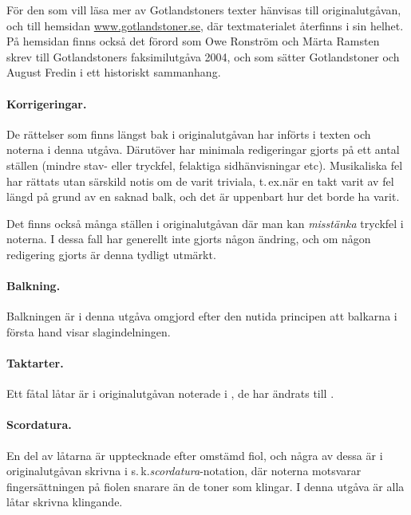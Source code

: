 {För den som vill läsa mer av Gotlandstoners texter hänvisas till originalutgåvan,
och till hemsidan \href{http://www.gotlandstoner.se/}{www.gotlandstoner.se}, där textmaterialet återfinns i sin helhet.
På hemsidan finns också det förord som Owe Ronström och
Märta Ramsten skrev till Gotlandstoners faksimilutgåva 2004, och som
sätter Gotlandstoner och August Fredin i ett historiskt sammanhang.

\paragraph{Korrigeringar.} De rättelser som finns längst bak i originalutgåvan har
införts i texten och noterna i denna utgåva. Därutöver har minimala redigeringar
gjorts på ett antal ställen (mindre stav- eller tryckfel, felaktiga sidhänvisningar etc).
\guillemotright{}Musikaliska fel\guillemotright{} har rättats utan särskild notis
om de varit \guillemotright{}triviala\guillemotright{}, t.\,ex.\@ när en takt
varit av fel längd på grund av en saknad balk, och det är uppenbart hur det borde ha varit.

Det finns också många ställen i originalutgåvan där man kan \textit{misstänka}
tryckfel i noterna. I dessa fall har generellt inte gjorts någon ändring, och
om någon redigering gjorts är denna tydligt utmärkt.

\paragraph{Balkning.} Balkningen är i denna utgåva omgjord efter den nutida principen
att balkarna i första hand visar slagindelningen.

\begingroup
{}
\paragraph{Taktarter.} Ett fåtal låtar är i originalutgåvan noterade i ,
de har ändrats till .
\endgroup

\paragraph{Scordatura.} En del av låtarna är upptecknade efter omstämd fiol, och några av
dessa är i originalutgåvan skrivna i s.\,k.\@ \textit{scordatura}-notation, där noterna
motsvarar fingersättningen på fiolen snarare än de toner som klingar. I denna
utgåva är alla låtar skrivna klingande.

}
